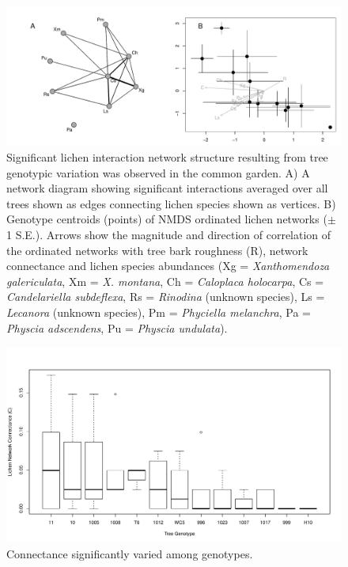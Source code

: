 \documentclass[fleqn,10pt]{wlscirep}
\begin{document}
\begin{figure}[ht]
\centering
\includegraphics[width=\linewidth]{cn_chplot_onc.pdf}
\caption{Significant lichen interaction network structure resulting
  from tree genotypic variation was observed in the common garden. A)
  A network diagram showing significant interactions averaged over all
  trees shown as edges connecting lichen species shown as vertices. B)
  Genotype centroids (points) of NMDS ordinated lichen networks ($\pm$
  1 S.E.). Arrows show the magnitude and direction of correlation of
  the ordinated networks with tree bark roughness (R), network
  connectance and lichen species abundances (Xg =
  \textit{Xanthomendoza galericulata}, Xm = \textit{X. montana}, Ch =
  \textit{Caloplaca holocarpa}, Cs = \textit{Candelariella
    subdeflexa}, Rs = \textit{Rinodina} (unknown species), Ls =
  \textit{Lecanora} (unknown species), Pm = \textit{Phyciella
    melanchra}, Pa = \textit{Physcia adscendens}, Pu = \textit{Physcia
    undulata}).}
\label{fig:ch_plot}
\end{figure}




\begin{figure}[ht]
\centering
\includegraphics[width=\linewidth]{connect_geno.pdf}
\caption{Connectance significantly varied among genotypes.}
\label{fig:connect}
\end{figure}
\end{document}
